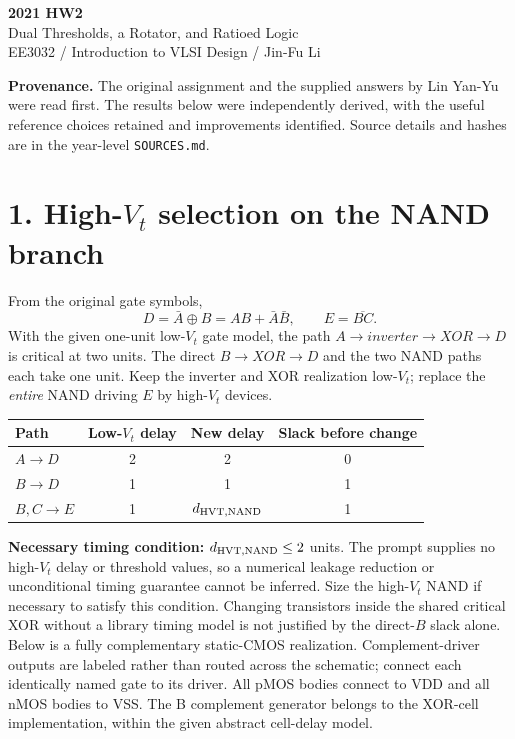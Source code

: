 \documentclass[11pt,a4paper]{article}
\begin{document}
\begin{center}{\LARGE\bfseries 2021 HW2}\\[4pt]{\large Dual Thresholds, a Rotator, and Ratioed Logic}\\[4pt]{\small EE3032 / Introduction to VLSI Design / Jin-Fu Li}\end{center}
\textbf{Provenance.} The original assignment and the supplied answers by Lin Yan-Yu were read first. The results below were independently derived, with the useful reference choices retained and improvements identified. Source details and hashes are in the year-level \texttt{SOURCES.md}.


\section*{1. High-$V_t$ selection on the NAND branch}
From the original gate symbols,
\[
 D=\bar A\oplus B=AB+\bar A\bar B,\qquad E=\overline{BC}.
\]
With the given one-unit low-$V_t$ gate model, the path $A\to inverter\to XOR\to D$ is critical at two units. The direct $B\to XOR\to D$ and the two NAND paths each take one unit. Keep the inverter and XOR realization low-$V_t$; replace the \emph{entire} NAND driving $E$ by high-$V_t$ devices.
\begin{center}\begin{tabular}{lccc}\toprule
Path&Low-$V_t$ delay&New delay&Slack before change\\\midrule
$A\to D$&2&2&0\\$B\to D$&1&1&1\\$B,C\to E$&1&$d_{\rm HVT,NAND}$&1\\\bottomrule
\end{tabular}\end{center}
\textbf{Necessary timing condition:} $d_{\rm HVT,NAND}\le2$ units. The prompt supplies no high-$V_t$ delay or threshold values, so a numerical leakage reduction or unconditional timing guarantee cannot be inferred. Size the high-$V_t$ NAND if necessary to satisfy this condition. Changing transistors inside the shared critical XOR without a library timing model is not justified by the direct-$B$ slack alone.
Below is a fully complementary static-CMOS realization. Complement-driver outputs are labeled rather than routed across the schematic; connect each identically named gate to its driver. All pMOS bodies connect to VDD and all nMOS bodies to VSS. The B complement generator belongs to the XOR-cell implementation, within the given abstract cell-delay model.
\end{document}
